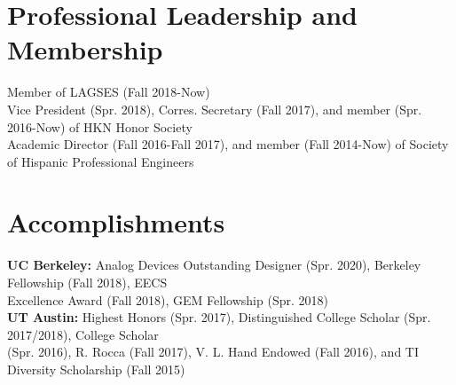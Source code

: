 \documentclass[letter]{res}
\begin{document}
\begin{resume}
\section{Professional Leadership and Membership}
Member of LAGSES (Fall 2018-Now)\\
Vice President (Spr. 2018), Corres. Secretary (Fall 2017), and member (Spr. 2016-Now) of HKN Honor Society\\
Academic Director (Fall 2016-Fall 2017), and member (Fall 2014-Now) of Society of Hispanic Professional Engineers\\

\vspace{-8mm}

\section{Accomplishments}

\textbf{UC Berkeley:} Analog Devices Outstanding Designer (Spr. 2020), Berkeley Fellowship (Fall 2018), EECS \\
Excellence Award (Fall 2018), GEM Fellowship (Spr. 2018) \\
\textbf{UT Austin:} Highest Honors (Spr. 2017), Distinguished College Scholar (Spr. 2017/2018), College Scholar \\
(Spr. 2016), R. Rocca (Fall 2017), V. L. Hand Endowed (Fall 2016), and TI Diversity Scholarship (Fall 2015)

\end{resume}
\end{document}
